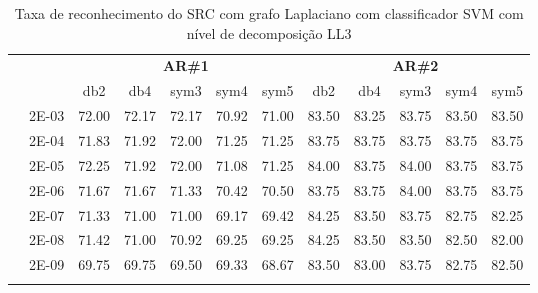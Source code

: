 \begin{table}[H]
\begin{tabular}{|c|c|c c c c c|c c c c c|}
	
\\\midrule
\end{tabular}
\end{table}




\begin{table}[H]
	\centering
    \normalsize
	\caption{Taxa de reconhecimento do SRC com grafo Laplaciano com classificador SVM com nível de decomposição LL3}
	\begin{tabular}{|c|c|c c c c c|c c c c c|}
\cline{3-12}
\multicolumn{2}{c|}{\multirow{2}{*}{}} & \multicolumn{5}{c|}{\textbf{AR\#1}}  & \multicolumn{5}{c|}{\textbf{AR\#2}} \\\cline{3-12}

\multicolumn{2}{c|}{}  & db2 & db4 & sym3 & sym4 & sym5 & db2 & db4& sym3 & sym4 & sym5 \\\hline
\multicolumn{1}{|c|}{ \multirow{6}{*}{\rotatebox[origin=c]{90}{\textbf{Gamma}}} }
&2E-03&	72.00&	72.17&	72.17&	70.92&	71.00&	83.50&	83.25&	83.75&	83.50&	83.50	\\\cline{2-12}
&2E-04&	71.83&	71.92&	72.00&	71.25&	71.25&	83.75&	83.75&	83.75&	83.75&	83.75	\\\cline{2-12}
&2E-05&	72.25&	71.92&	72.00&	71.08&	71.25&	84.00&	83.75&	84.00&	83.75&	83.75	\\\cline{2-12}
&2E-06&	71.67&	71.67&	71.33&	70.42&	70.50&	83.75&	83.75&	84.00&	83.75&	83.75	\\\cline{2-12}
&2E-07&	71.33&	71.00&	71.00&	69.17&	69.42&	84.25&	83.50&	83.75&	82.75&	82.25	\\\cline{2-12}
&2E-08&	71.42&	71.00&	70.92&	69.25&	69.25&	84.25&	83.50&	83.50&	82.50&	82.00	\\\cline{2-12}
&2E-09&	69.75&	69.75&	69.50&	69.33&	68.67&	83.50&	83.00&	83.75&	82.75&	82.50	


	
\\ \midrule
\multicolumn{12}{c}{}\\ 


\end{tabular}
\end{table}
